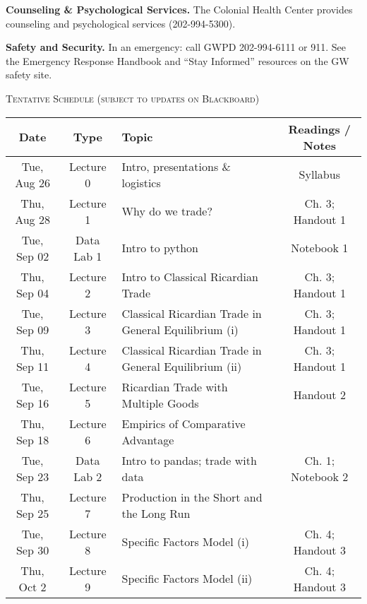 \documentclass[11pt]{article}
\begin{document}
\smallskip
\textbf{Counseling \& Psychological Services.} The Colonial Health Center provides counseling and psychological services (202-994-5300).

\smallskip
\textbf{Safety and Security.} In an emergency: call GWPD 202-994-6111 or 911. See the Emergency Response Handbook and “Stay Informed” resources on the GW safety site.

\bigskip

\noindent\textsc{Tentative Schedule (subject to updates on Blackboard)}

\medskip
\begin{center}
\begin{tabular}{|c|c|l|c|}
\hline \textbf{Date} & \textbf{Type} & \textbf{Topic} & \textbf{Readings / Notes} \\ \hline
			
		Tue, Aug 26 & Lecture 0 & Intro, presentations \& logistics & Syllabus \\ \hline
		Thu, Aug 28 & Lecture 1  & Why do we trade? & Ch. 3; Handout 1 \\ \hline
		Tue, Sep 02 & Data Lab 1 & Intro to python & Notebook 1 \\ \hline
	    Thu, Sep 04 &Lecture 2 & Intro to Classical Ricardian Trade & Ch. 3; Handout 1 \\ \hline	
		Tue, Sep 09 & Lecture 3 & Classical Ricardian Trade in General Equilibrium (i) & Ch. 3; Handout 1 \\ \hline
		Thu, Sep 11 & Lecture 4 & Classical Ricardian Trade in General Equilibrium (ii) & Ch. 3; Handout 1 \\ \hline
		Tue, Sep 16 & Lecture 5 & Ricardian Trade with Multiple Goods & Handout 2 \\ \hline
		
		Thu, Sep 18 & Lecture 6 & Empirics of Comparative Advantage &  \textemdash  \\ \hline

		Tue, Sep 23 & Data Lab 2 & Intro to pandas; trade with data & Ch. 1; Notebook 2 \\ \hline

  	Thu, Sep 25 &  Lecture 7 & Production in the Short and the Long Run & \textemdash \\ \hline

        Tue, Sep 30 &  Lecture 8 & Specific Factors Model (i) & Ch. 4; Handout 3  \\ \hline

        Thu, Oct 2 &  Lecture 9 & Specific Factors Model (ii) & Ch. 4; Handout 3 \\ \hline
        

\end{tabular}
\end{center}
\end{document}
